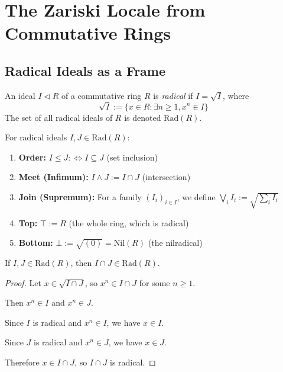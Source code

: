 \chapter{The Zariski Locale from Commutative Rings}

\section{Radical Ideals as a Frame}

\begin{definition}
  \label{def:radical-ideal}
  \leanok
  An ideal $I \triangleleft R$ of a commutative ring $R$ is \emph{radical} if $I = \sqrt{I}$, where
  $$\sqrt{I} := \{x \in R : \exists n \geq 1, x^n \in I\}$$
  The set of all radical ideals of $R$ is denoted $\mathrm{Rad}(R)$.
\end{definition}

\begin{definition}
  \label{def:radical-ideal-operations}
  \leanok
  For radical ideals $I, J \in \mathrm{Rad}(R)$:
  \begin{enumerate}
    \item \textbf{Order:} $I \leq J :\iff I \subseteq J$ (set inclusion)
    \item \textbf{Meet (Infimum):} $I \land J := I \cap J$ (intersection)
    \item \textbf{Join (Supremum):} For a family $(I_i)_{i \in I}$, we define $\bigvee_i I_i := \sqrt{\sum_i I_i}$
    \item \textbf{Top:} $\top := R$ (the whole ring, which is radical)
    \item \textbf{Bottom:} $\bot := \sqrt{(0)} = \mathrm{Nil}(R)$ (the nilradical)
  \end{enumerate}
\end{definition}

\begin{lemma}
  \label{lemma:intersection-radical}
  \leanok
  If $I, J \in \mathrm{Rad}(R)$, then $I \cap J \in \mathrm{Rad}(R)$.
\end{lemma}

\begin{proof}
  \leanok
  Let $x \in \sqrt{I \cap J}$, so $x^n \in I \cap J$ for some $n \geq 1$.
  
  Then $x^n \in I$ and $x^n \in J$.
  
  Since $I$ is radical and $x^n \in I$, we have $x \in I$.
  
  Since $J$ is radical and $x^n \in J$, we have $x \in J$.
  
  Therefore $x \in I \cap J$, so $I \cap J$ is radical.
\end{proof}

